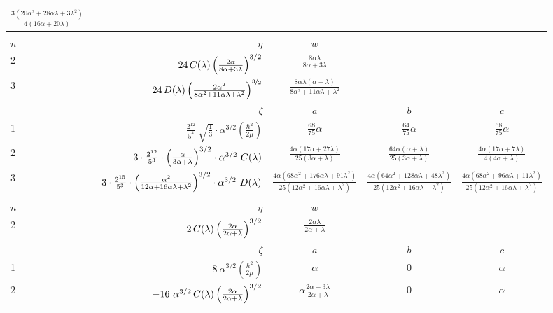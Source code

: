 \documentclass[onecolumn,preprint,superscriptaddress,nofootinbib,notitlepage,10pt,linenumbers]{revtex4-1}
\newcommand{\cc}{\ensuremath C(\lambda)}
\newcommand{\dd}{\ensuremath D(\lambda)}
\newcommand{\abab}{\ensuremath $(ab)\!\!:\!\!(ab)$}
\newcommand{\ebcde}{\ensuremath $(abcd)\wasytherefore(a)$}
\begin{document}
\begin{longtable}{l|rccc}
      $\frac{3(20\alpha^2+28\alpha\lambda+3\lambda^2)}{4(16\alpha+20\lambda)}$ \\
\hline\hline
\multicolumn{5}{c}{\fbox{\ebcde}}\\
$n$ & $\eta$  & $w$ & &\\
2   & $24\,\cc\left(\frac{2\alpha}{8\alpha+3\lambda}\right)^{3/2}$ & 
      $\frac{8\alpha\lambda}{8\alpha+3\lambda}$ &  &  \\
3   & $24\,\dd\left(\frac{2\alpha^2}{8\alpha^2+11\alpha\lambda+\lambda^2}\right)^{\nicefrac{3}{2}}$ & 
      $\frac{8\alpha\lambda(\alpha+\lambda)}{8\alpha^2+11\alpha\lambda+\lambda^2}$ &  &  \\
\hline
    & $\zeta$ & $a$ & $b$ & $c$ \\
1   & $\frac{2^{12}}{5^4}~\sqrt{\frac{1}{3}}\cdot\alpha^{3/2}\left(\frac{\hbar^2}{2\mu}\right)$ &
      $\frac{68}{75}\alpha$ &
      $\frac{64}{75}\alpha$ &
      $\frac{68}{75}\alpha$ \\
2   &$-3\cdot\frac{2^{12}}{5^3}\cdot\left(\frac{\alpha}{3\alpha+\lambda}\right)^{3/2}\cdot\alpha^{3/2}~\cc$ & 
      $\frac{4\alpha(17\alpha+27\lambda)}{25(3\alpha+\lambda)}$ &
      $\frac{64\alpha(\alpha+\lambda)}{25(3\alpha+\lambda)}$ &
      $\frac{4\alpha(17\alpha+7\lambda)}{4(4\alpha+\lambda)}$ \\
3   & $-3\cdot\frac{2^{15}}{5^3}\cdot\left(\frac{\alpha^2}{12\alpha+16\alpha\lambda+\lambda^2}\right)^{3/2}\cdot\alpha^{3/2}~\dd$ & 
      $\frac{4\alpha(68\alpha^2+176\alpha\lambda+91\lambda^2)}{25(12\alpha^2+16\alpha\lambda+\lambda^2)}$ &
      $\frac{4\alpha(64\alpha^2+128\alpha\lambda+48\lambda^2)}{25(12\alpha^2+16\alpha\lambda+\lambda^2)}$ &
      $\frac{4\alpha(68\alpha^2+96\alpha\lambda+11\lambda^2)}{25(12\alpha^2+16\alpha\lambda+\lambda^2)}$ \\
\hline\hline
%
\multicolumn{5}{c}{\fbox{\abab}}\\
$n$ & $\eta$  & $w$ & &\\
2   & $2\,\cc\left(\frac{2\alpha}{2\alpha+\lambda}\right)^{3/2}$ & 
      $\frac{2\alpha\lambda}{2\alpha+\lambda}$ & &  \\
\hline
           & $\zeta$ & $a$ & $b$ & $c$ \\
1   & $8~\alpha^{3/2}\left(\frac{\hbar^2}{2\mu}\right)$ & 
      $\alpha$ & $0$ & 
      $\alpha$ \\
2   & $-16~\alpha^{3/2}\,\cc\left(\frac{2\alpha}{2\alpha+\lambda}\right)^{3/2}$ & 
      $\alpha\frac{2\alpha+3\lambda}{2\alpha+\lambda}$ & 
      $0$ & $\alpha$ \\
\hline\hline

\end{longtable}
\end{document}
